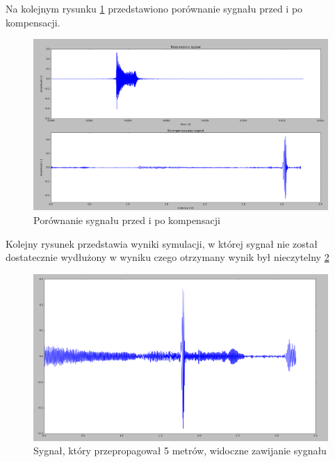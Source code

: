 Na kolejnym rysunku \ref{fig:wil1} przedstawiono porównanie sygnału przed i po kompensacji.
\begin{figure}[h]
\centering
\includegraphics[width=14cm]{Zdjecia/4/wilcox1}
\caption{Porównanie sygnału przed i po kompensacji}
\label{fig:wil1}
\end{figure}
Kolejny rysunek przedstawia wyniki symulacji, w której sygnał nie został dostatecznie wydłużony w wyniku czego otrzymany wynik był nieczytelny \ref{fig:zawij}
\begin{figure}[h]
\centering
\includegraphics[width=14cm]{Zdjecia/4/naklada}
\caption{Sygnał, który przepropagował 5 metrów, widoczne zawijanie sygnału}
\label{fig:zawij}
\end{figure}

